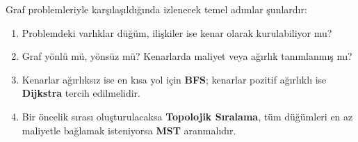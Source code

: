 Graf problemleriyle karşılaşıldığında izlenecek temel adımlar şunlardır:
\begin{enumerate}
    \item Problemdeki varlıklar düğüm, ilişkiler ise kenar olarak kurulabiliyor mu?
    \item Graf yönlü mü, yönsüz mü? Kenarlarda maliyet veya ağırlık tanımlanmış mı?
    \item Kenarlar ağırlıksız ise en kısa yol için \textbf{BFS}; kenarlar pozitif ağırlıklı ise \textbf{Dijkstra} tercih edilmelidir.
    \item Bir öncelik sırası oluşturulacaksa \textbf{Topolojik Sıralama}, tüm düğümleri en az maliyetle bağlamak isteniyorsa \textbf{MST} aranmalıdır.
\end{enumerate}
